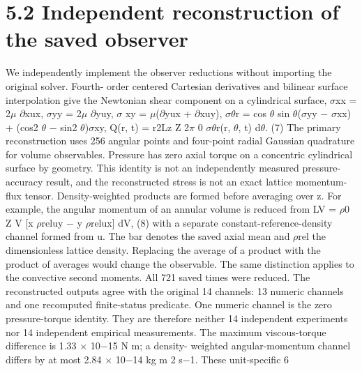 \documentclass[11pt]{article}
\begin{document}
\section*{5.2 Independent reconstruction of the saved observer}

We independently implement the observer reductions without importing the original solver. Fourth-
order centered Cartesian derivatives and bilinear surface interpolation give the Newtonian shear
component on a cylindrical surface,
\ensuremath{\sigma}xx = 2\ensuremath{\mu} \ensuremath{\partial}xux, \ensuremath{\sigma}yy = 2\ensuremath{\mu} \ensuremath{\partial}yuy, \ensuremath{\sigma} xy = \ensuremath{\mu}(\ensuremath{\partial}yux + \ensuremath{\partial}xuy),
\ensuremath{\sigma}\ensuremath{\theta}r = cos \ensuremath{\theta} sin \ensuremath{\theta}(\ensuremath{\sigma}yy \ensuremath{-} \ensuremath{\sigma}xx) + (cos2 \ensuremath{\theta} \ensuremath{-} sin2 \ensuremath{\theta})\ensuremath{\sigma}xy,
Q(r, t) = r2Lz
Z 2\ensuremath{\pi}
0
\ensuremath{\sigma}\ensuremath{\theta}r(r, \ensuremath{\theta}, t) d\ensuremath{\theta}.
(7)
The primary reconstruction uses 256 angular points and four-point radial Gaussian quadrature for
volume observables. Pressure has zero axial torque on a concentric cylindrical surface by geometry.
This identity is not an independently measured pressure-accuracy result, and the reconstructed
stress is not an exact lattice momentum-flux tensor.
Density-weighted products are formed before averaging over z. For example, the angular momentum
of an annular volume is reduced from
LV = \ensuremath{\rho}0
Z
V
[x \ensuremath{\rho}reluy \ensuremath{-} y \ensuremath{\rho}relux] dV, (8)
with a separate constant-reference-density channel formed from u. The bar denotes the saved
axial mean and \ensuremath{\rho}rel the dimensionless lattice density. Replacing the average of a product with the
product of averages would change the observable. The same distinction applies to the convective
second moments.
All 721 saved times were reduced. The reconstructed outputs agree with the original 14 channels:
13 numeric channels and one recomputed finite-status predicate. One numeric channel is the zero
pressure-torque identity. They are therefore neither 14 independent experiments nor 14 independent
empirical measurements. The maximum viscous-torque difference is 1.33 \ensuremath{\times} 10\ensuremath{-}15 N m; a density-
weighted angular-momentum channel differs by at most 2.84 \ensuremath{\times} 10\ensuremath{-}14 kg m 2 s\ensuremath{-}1. These unit-specific
6
\end{document}
